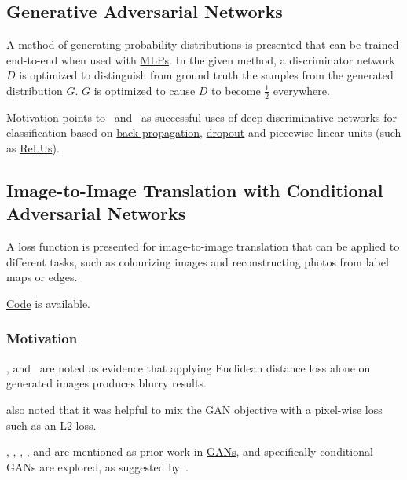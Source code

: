 \documentclass[a4paper, 12pt]{article}
\begin{document}
%
%

\subsection{Generative Adversarial Networks\citet{NIPS2014_5423}}
\label{gan}

A method of generating probability distributions is presented that can be
trained end-to-end when used with \hyperref[multilayer_perceptron]{MLPs}. In
the given method, a discriminator network $D$ is optimized to distinguish from
ground truth the samples from the generated distribution $G$. $G$ is optimized
to cause $D$ to become $\frac{1}{2}$ everywhere.

Motivation points to~\citet{deepSpeechReviewSPM2012} and~\citet{NIPS2012_4824} as
successful uses of deep discriminative networks for classification based on
\hyperref[backprop]{back propagation}, \hyperref[dropout]{dropout} and
piecewise linear units (such as \hyperref[rectified_linear_units]{ReLUs}).


\subsection{Image-to-Image Translation with Conditional Adversarial
            Networks\citet{DBLP:journals/corr/IsolaZZE16}}

A loss function is presented for image-to-image translation that can be applied
to different tasks, such as colourizing images and reconstructing photos from
label maps or edges.

\href{https://github.com/phillipi/pix2pix}{Code} is available.

\subsubsection{Motivation}

\citet{DBLP:journals/corr/LarsenSW15}, \citet{DBLP:journals/corr/PathakKDDE16}
and~\citet{DBLP:journals/corr/ZhangIE16} are noted as evidence that applying
Euclidean distance loss alone on generated images produces blurry results.

\citet{DBLP:journals/corr/PathakKDDE16} also noted that it was helpful to mix
the GAN objective with a pixel-wise loss such as an L2 loss.

\citet{NIPS2014_5423}, \citet{DBLP:journals/corr/DentonCSF15},
\citet{DBLP:journals/corr/RadfordMC15},
\citet{DBLP:journals/corr/SalimansGZCRC16}, and
\citet{DBLP:journals/corr/ZhaoML16} are mentioned as prior work in
\hyperref[gan]{GANs}, and specifically conditional GANs are explored, as
suggested by~\citet{NIPS2014_5423}.
\end{document}
